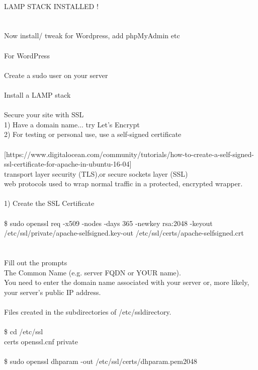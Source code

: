 \documentclass[10pt,a4paper]{article}
\begin{document}
{{{{{{{{{{{{{{{{\\
LAMP STACK INSTALLED !\\
\\
\\
Now install/ tweak for Wordpress, add phpMyAdmin etc\\
\\
For WordPress\\
\\
Create a sudo user on your server\\
\\
Install a LAMP stack\\
\\
Secure your site with SSL\\
	1) Have a domain name... try Let's Encrypt\\
	2) For testing or personal use, use a self-signed certificate\\
\\
[https://www.digitalocean.com/community/tutorials/how-to-create-a-self-signed-ssl-certificate-for-apache-in-ubuntu-16-04}{\large ]\\
transport layer security (TLS),or  secure sockets layer (SSL)\\
web protocols used to wrap normal traffic in a protected, encrypted wrapper.\\
\\
1) Create the SSL Certificate\\
\\
\$ sudo openssl req -x509 -nodes -days 365 -newkey rsa:2048 -keyout /etc/ssl/private/apache-selfsigned.key}{\large  -out /etc/ssl/certs/apache-selfsigned.crt}{\large \\
\\
\\
Fill out the prompts\\
The Common Name (e.g. server FQDN or YOUR name). \\
You need to enter the domain name associated with your server or, more likely, your server's public IP address.\\
\\
Files created in the subdirectories of /etc/ssl}{\large  directory.\\
\\
\$ cd /etc/ssl}{\large \\
certs  openssl.cnf  private\\
\\
\$ sudo openssl dhparam -out /etc/ssl/certs/dhparam.pem}{\large  2048\\
}}}}}}}}}}}}}}}}
\end{document}
